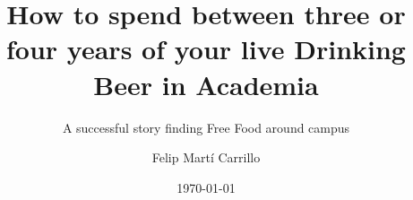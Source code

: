 \documentclass{fsetswin-phd}
\author{
	Felip Mart\'{i} Carrillo 
}
\title{How to spend between three or four years of your live Drinking Beer in Academia}
\subtitle{A successful story finding Free Food around campus}
\date{\mydate\today}
\begin{document}
    \makefrontmatter


    \cleardoublepage


    

    

    




    
    \begin{appendices}

        

        


    \end{appendices}
\end{document}
